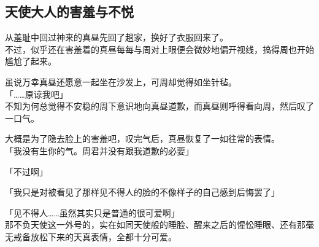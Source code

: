\subsection{天使大人的害羞与不悦}

从羞耻中回过神来的真昼先回了趟家，换好了衣服回来了。\\

不过，似乎还在害羞着的真昼每每与周对上眼便会微妙地偏开视线，搞得周也开始尴尬了起来。

虽说万幸真昼还愿意一起坐在沙发上，可周却觉得如坐针毡。\\

「……原谅我吧」\\

不知为何总觉得不安稳的周下意识地向真昼道歉，而真昼则呼得看向周，然后叹了一口气。

大概是为了隐去脸上的害羞吧，叹完气后，真昼恢复了一如往常的表情。\\

「我没有生你的气。周君并没有跟我道歉的必要」

「不过啊」

「我只是对被看见了那样见不得人的脸的不像样子的自己感到后悔罢了」

「见不得人……虽然其实只是普通的很可爱啊」\\

那不负天使这一外号的，实在如同天使般的睡脸、醒来之后的惺忪睡眼、还有那毫无戒备放松下来的天真表情，全都十分可爱。\\

